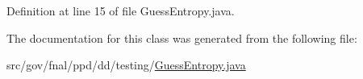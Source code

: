 Definition at line 15 of file Guess\-Entropy.\-java.



The documentation for this class was generated from the following file\-:\begin{DoxyCompactItemize}
\item 
src/gov/fnal/ppd/dd/testing/\hyperlink{GuessEntropy_8java}{Guess\-Entropy.\-java}\end{DoxyCompactItemize}
